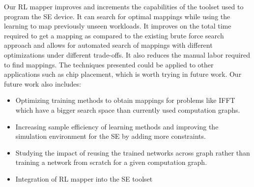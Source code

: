 Our RL mapper improves and increments the capabilities of the toolset used to program the SE device. 
It can search for optimal mappings while using the learning to map previously unseen workloads. 
It improves on the total time required to get a mapping as compared to the existing brute force search approach and allows for automated search of mappings with different optimizations under different trade-offs. 
It also reduces the manual labor required to find mappings. 
The techniques presented could be applied to other applications such as chip placement, which is worth trying in future work. 
Our future work also includes: 
\begin{itemize}
    \item Optimizing training methods to obtain mappings for problems like IFFT which have a bigger search space than currently used computation graphs. 
    \item Increasing sample efficiency of learning methods and improving the simulation environment for the SE by adding more constraints. 
    \item Studying the impact of reusing the trained networks across graph rather than training a network from scratch for a given computation graph.
    \item Integration of RL mapper into the SE toolset 
\end{itemize}